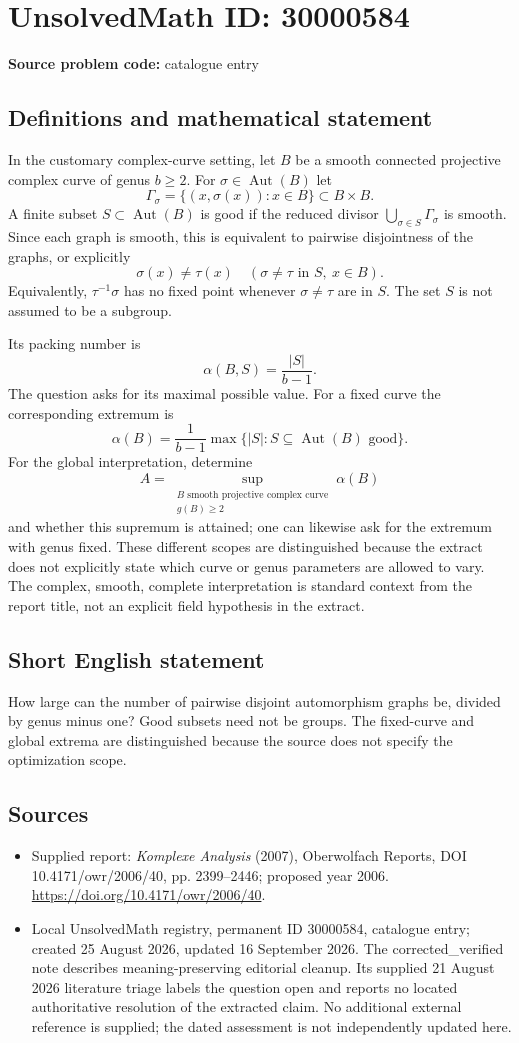 \documentclass[11pt]{article}
\begin{document}
\section*{UnsolvedMath ID: 30000584}
\textbf{Source problem code:} catalogue entry
\subsection{Definitions and mathematical statement}
In the customary complex-curve setting, let $B$ be a smooth connected projective complex curve of genus $b\geq2$. For $\sigma\in\operatorname{Aut}(B)$ let
\[
\Gamma_\sigma=\{(x,\sigma(x)):x\in B\}\subset B\times B.
\]
A finite subset $S\subset\operatorname{Aut}(B)$ is good if the reduced divisor $\bigcup_{\sigma\in S}\Gamma_\sigma$ is smooth. Since each graph is smooth, this is equivalent to pairwise disjointness of the graphs, or explicitly
\[
\sigma(x)\ne\tau(x)\quad
(\sigma\ne\tau\text{ in }S,\ x\in B).
\]
Equivalently, $\tau^{-1}\sigma$ has no fixed point whenever $\sigma\ne\tau$ are in $S$. The set $S$ is not assumed to be a subgroup.

Its packing number is
\[
\alpha(B,S)=\frac{|S|}{b-1}.
\]
The question asks for its maximal possible value. For a fixed curve the corresponding extremum is
\[
\alpha(B)=\frac{1}{b-1}\max\{|S|:S\subseteq\operatorname{Aut}(B)\text{ good}\}.
\]
For the global interpretation, determine
\[
A=\sup_{\substack{B\text{ smooth projective complex curve}\\g(B)\geq2}}\alpha(B)
\]
and whether this supremum is attained; one can likewise ask for the extremum with genus fixed. These different scopes are distinguished because the extract does not explicitly state which curve or genus parameters are allowed to vary. The complex, smooth, complete interpretation is standard context from the report title, not an explicit field hypothesis in the extract.
\subsection{Short English statement}
How large can the number of pairwise disjoint automorphism graphs be, divided by genus minus one? Good subsets need not be groups. The fixed-curve and global extrema are distinguished because the source does not specify the optimization scope.
\subsection{Sources}
\begin{itemize}
\item Supplied report: \emph{Komplexe Analysis} (2007), Oberwolfach Reports, DOI 10.4171/owr/2006/40, pp. 2399--2446; proposed year 2006. \url{https://doi.org/10.4171/owr/2006/40}.
\item Local UnsolvedMath registry, permanent ID 30000584, catalogue entry; created 25 August 2026, updated 16 September 2026. The corrected\_verified note describes meaning-preserving editorial cleanup. Its supplied 21 August 2026 literature triage labels the question open and reports no located authoritative resolution of the extracted claim. No additional external reference is supplied; the dated assessment is not independently updated here.
\end{itemize}
\end{document}
